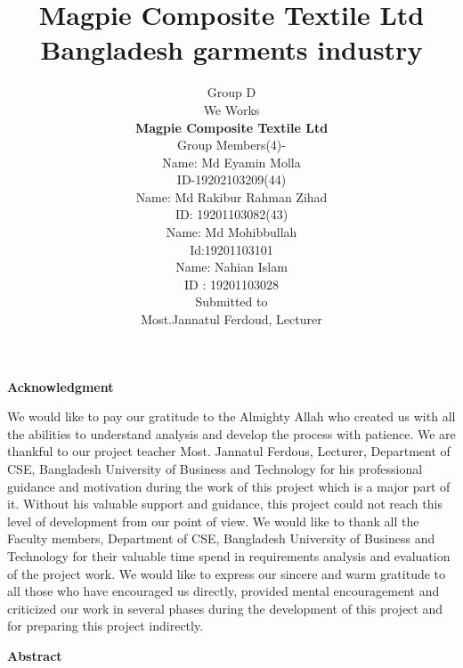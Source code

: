 \documentclass{article}
\begin{document}
\maketitle
\begin{center}

\author{Group D\\
We Works\\ \textbf{Magpie Composite Textile Ltd}\\ Group Members(4)-\\Name: Md Eyamin Molla \\ ID-19202103209(44)\\ Name: Md Rakibur Rahman Zihad\\ ID: 19201103082(43)\\ Name: Md Mohibbullah\\Id:19201103101\\ Name: Nahian Islam\\ID : 19201103028\\
Submitted to\\ Most.Jannatul Ferdoud, Lecturer
}
  
\newpage
\title{\huge Magpie Composite Textile Ltd\\
\small Bangladesh garments industry\\
}
\end{center}
\begin{center}
    
\huge \textbf {Acknowledgment}
\end{center}
We would like to pay our gratitude to the Almighty Allah who created us with all the abilities
to understand analysis and develop the process with patience. We are thankful to our project
teacher Most. Jannatul Ferdous, Lecturer, Department of CSE, Bangladesh University of
Business and Technology for his professional guidance and motivation during the work of this
project which is a major part of it. Without his valuable support and guidance, this project
could not reach this level of development from our point of view.
We would like to thank all the Faculty members, Department of CSE, Bangladesh University of
Business and Technology for their valuable time spend in requirements analysis and evaluation
of the project work. We would like to express our sincere and warm gratitude to all those who
have encouraged us directly, provided mental encouragement and criticized our work in several
phases during the development of this project and for preparing this project indirectly.
\newpage
\begin{center}
    \huge \textbf{Abstract}
\end{center}
\end{document}
